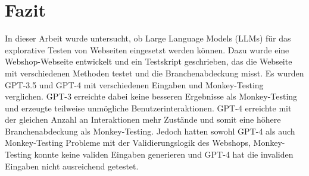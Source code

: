 \chapter{Fazit}
\label{ch:conclusion}

In dieser Arbeit wurde untersucht, ob Large Language Models (LLMs) für das explorative Testen von Webseiten eingesetzt werden können.
Dazu wurde eine Webshop-Webseite entwickelt und ein Testskript geschrieben, das die Webseite mit verschiedenen Methoden testet und die Branchenabdeckung misst.
Es wurden GPT-3.5 und GPT-4 mit verschiedenen Eingaben und Monkey-Testing verglichen.
GPT-3 erreichte dabei keine besseren Ergebnisse als Monkey-Testing und erzeugte teilweise unmögliche Benutzerinteraktionen.
GPT-4 erreichte mit der gleichen Anzahl an Interaktionen mehr Zustände und somit eine höhere Branchenabdeckung als Monkey-Testing.
Jedoch hatten sowohl GPT-4 als auch Monkey-Testing Probleme mit der Validierungslogik des Webshops, Monkey-Testing konnte keine validen Eingaben generieren und GPT-4 hat die invaliden Eingaben nicht ausreichend getestet.
